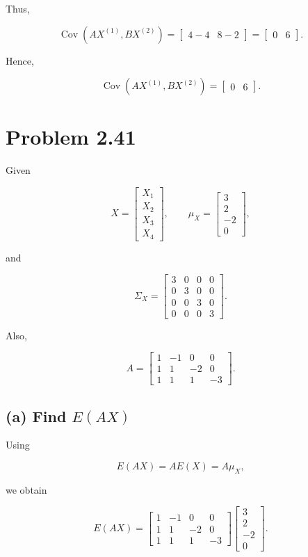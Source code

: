 \documentclass[12pt]{article}
\begin{document}
Thus,

\[
\operatorname{Cov}(AX^{(1)},BX^{(2)})
=
\begin{bmatrix}
4-4&8-2
\end{bmatrix}
=
\begin{bmatrix}
0&6
\end{bmatrix}.
\]

Hence,

\[
\boxed{
\operatorname{Cov}(AX^{(1)},BX^{(2)})
=
\begin{bmatrix}
0&6
\end{bmatrix}
}.
\]


\section*{Problem 2.41}

Given

\[
X=
\begin{bmatrix}
X_1\\
X_2\\
X_3\\
X_4
\end{bmatrix},
\qquad
\mu_X=
\begin{bmatrix}
3\\
2\\
-2\\
0
\end{bmatrix},
\]

and

\[
\Sigma_X=
\begin{bmatrix}
3&0&0&0\\
0&3&0&0\\
0&0&3&0\\
0&0&0&3
\end{bmatrix}.
\]

Also,

\[
A=
\begin{bmatrix}
1&-1&0&0\\
1&1&-2&0\\
1&1&1&-3
\end{bmatrix}.
\]

\subsection*{(a) Find $E(AX)$}

Using

\[
E(AX)=AE(X)=A\mu_X,
\]

we obtain

\[
E(AX)
=
\begin{bmatrix}
1&-1&0&0\\
1&1&-2&0\\
1&1&1&-3
\end{bmatrix}
\begin{bmatrix}
3\\
2\\
-2\\
0
\end{bmatrix}.
\]
\end{document}
